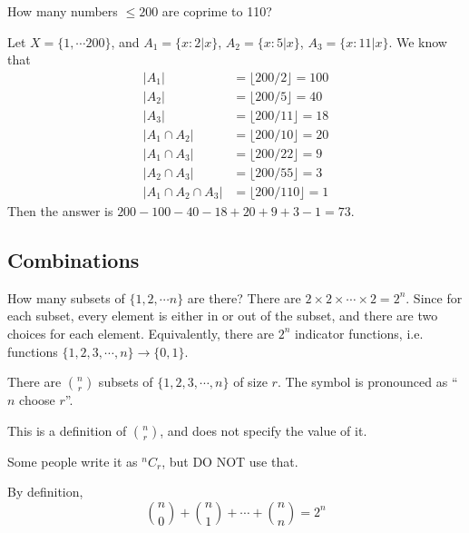 \documentclass[a4paper]{article}
\begin{document}
  \begin{eg}
    How many numbers $\leq 200$ are coprime to 110?

    Let $X = \{ 1, \cdots 200\}$, and $A_1 = \{x: 2 | x\}$, $A_2 = \{x: 5|x\}$, $A_3 = \{x: 11|x\}$. We know that
    \begin{align*}
      |A_1| &= \lfloor 200/2\rfloor = 100\\
      |A_2| &= \lfloor 200/5\rfloor = 40\\
      |A_3| &= \lfloor 200/11\rfloor = 18\\
      |A_1\cap A_2| &= \lfloor 200/10\rfloor = 20\\
      |A_1\cap A_3| &= \lfloor 200/22\rfloor = 9\\
      |A_2\cap A_3| &= \lfloor 200/55\rfloor = 3\\
      |A_1 \cap A_2\cap A_3| &= \lfloor 200/110\rfloor = 1
    \end{align*}
    Then the answer is $200 - 100 - 40 - 18 + 20 + 9 + 3 - 1 = 73$.
  \end{eg}

  \subsection{Combinations}
  \begin{eg}
    How many subsets of $\{1, 2, \cdots n\}$ are there? There are $2\times 2\times \cdots \times 2 = 2^n$. Since for each subset, every element is either in or out of the subset, and there are two choices for each element. Equivalently, there are $2^n$ indicator functions, i.e. functions $\{1, 2, 3, \cdots, n\} \to \{0, 1\}$.
  \end{eg}

  \begin{defi}
    There are $\binom{n}{r}$ subsets of $\{1, 2, 3, \cdots, n\}$ of size $r$. The symbol is pronounced as ``$n$ choose $r$''.

    \note This is a definition of $\binom{n}{r}$, and does not specify the value of it.
  \end{defi}

  \begin{notation}
    Some people write it as $^nC_r$, but DO NOT use that.
  \end{notation}

  \begin{prop}
    By definition, 
    \[
      \binom{n}{0} + \binom{n}{1} + \cdots + \binom{n}{n} = 2^n
    \]
  \end{prop}
\end{document}
